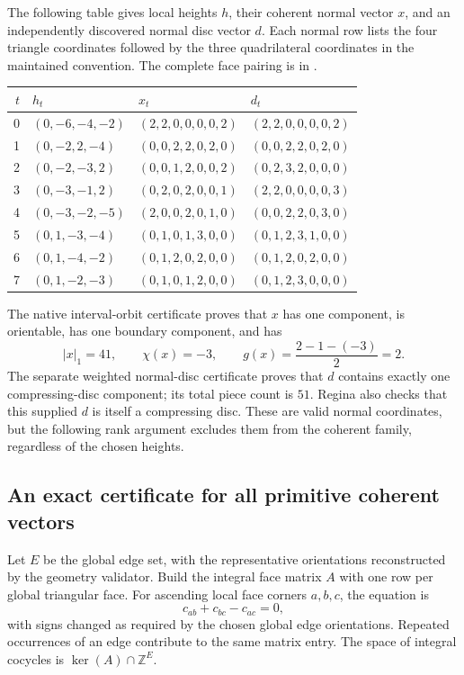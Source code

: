 The following table gives local heights $h$, their coherent normal vector
$x$, and an independently discovered normal disc vector $d$. Each normal
row lists the four triangle coordinates followed by the three quadrilateral
coordinates in the maintained convention. The complete face pairing is in
.
\begin{center}
\small
\begin{tabular}{rlll}
\toprule
$t$ & $h_t$ & $x_t$ & $d_t$\\
\midrule
0 & $(0,-6,-4,-2)$ & $(2,2,0,0,0,0,2)$ & $(2,2,0,0,0,0,2)$\\
1 & $(0,-2,2,-4)$ & $(0,0,2,2,0,2,0)$ & $(0,0,2,2,0,2,0)$\\
2 & $(0,-2,-3,2)$ & $(0,0,1,2,0,0,2)$ & $(0,2,3,2,0,0,0)$\\
3 & $(0,-3,-1,2)$ & $(0,2,0,2,0,0,1)$ & $(2,2,0,0,0,0,3)$\\
4 & $(0,-3,-2,-5)$ & $(2,0,0,2,0,1,0)$ & $(0,0,2,2,0,3,0)$\\
5 & $(0,1,-3,-4)$ & $(0,1,0,1,3,0,0)$ & $(0,1,2,3,1,0,0)$\\
6 & $(0,1,-4,-2)$ & $(0,1,2,0,2,0,0)$ & $(0,1,2,0,2,0,0)$\\
7 & $(0,1,-2,-3)$ & $(0,1,0,1,2,0,0)$ & $(0,1,2,3,0,0,0)$\\
\bottomrule
\end{tabular}
\end{center}

The native interval-orbit certificate proves that $x$ has one component,
is orientable, has one boundary component, and has
\[
 |x|_1=41,\qquad \chi(x)=-3,\qquad
 g(x)=\frac{2-1-(-3)}2=2.
\]
The separate weighted normal-disc certificate proves that $d$ contains
exactly one compressing-disc component; its total piece count is $51$.
Regina also checks that this supplied $d$ is itself a compressing disc.
These are valid normal coordinates, but the following rank argument excludes
them from the coherent family, regardless of the chosen heights.

\subsection{An exact certificate for all primitive coherent vectors}

Let $E$ be the global edge set, with the representative orientations
reconstructed by the geometry validator. Build the integral face matrix
$A$ with one row per global triangular face. For ascending local face
corners $a,b,c$, the equation is
\[
 c_{ab}+c_{bc}-c_{ac}=0,
\]
with signs changed as required by the chosen global edge orientations.
Repeated occurrences of an edge contribute to the same matrix entry.
The space of integral cocycles is $\ker(A)\cap\mathbb Z^E$.

